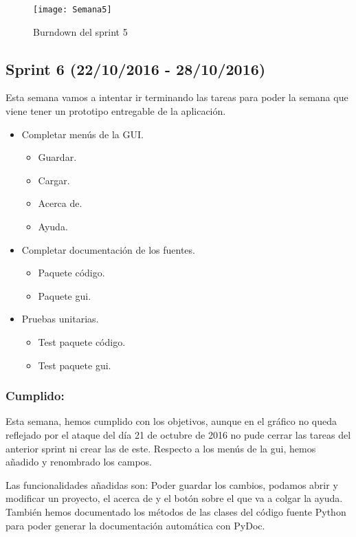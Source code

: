 \begin{figure}[h]
\centering
\texttt{[image: Semana5]}
\caption{Burndown del sprint 5}
\label{fig:A.2.5}
\end{figure}
\subsection{Sprint 6 (22/10/2016 - 28/10/2016)}
Esta semana vamos a intentar ir terminando las tareas para poder la semana que viene tener un prototipo entregable de la aplicación.

\begin{itemize}
\item Completar menús de la GUI.
	\begin{itemize}
		\item Guardar.
		\item Cargar.
		\item Acerca de.
		\item Ayuda.
	\end{itemize}
\item Completar documentación de los fuentes.
	\begin{itemize}
		\item Paquete código.
		\item Paquete gui.
	\end{itemize}
\item Pruebas unitarias.
	\begin{itemize}
		\item Test paquete código.
		\item Test paquete gui.
	\end{itemize}
\end{itemize}
\subsubsection{Cumplido:}
Esta semana, hemos cumplido con los objetivos, aunque en el gráfico no queda reflejado por el ataque del día 21 de octubre de 2016 \cite{wiki:Dyn} no pude cerrar las tareas del anterior sprint ni crear las de este.
Respecto a los menús de la gui, hemos añadido y renombrado los campos.

Las funcionalidades añadidas son:
Poder guardar los cambios, podamos abrir y modificar un proyecto, el acerca de y el botón sobre el que va a colgar la ayuda.
También hemos documentado los métodos de las clases del código fuente Python para poder generar la documentación automática con PyDoc.

